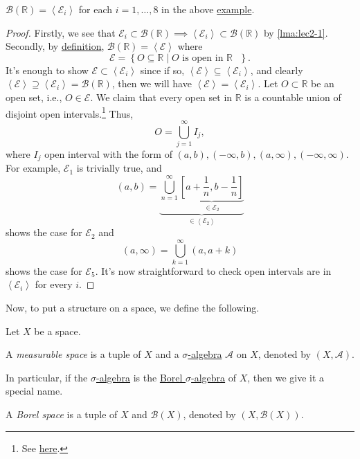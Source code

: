 \begin{proposition}
	\(\mathcal{B} (\mathbb{R} ) = \left<\mathcal{E}_{i}\right> \) for each \(i = 1, \dots, 8\) in the above \hyperref[eg:lec2]{example}.
\end{proposition}
\begin{proof}
	Firstly, we see that \(\mathcal{E} _{i}\subset \mathcal{B} (\mathbb{R} ) \implies \left<\mathcal{E} _{i}\right>\subset \mathcal{B} (\mathbb{R} )\) by \autoref{lma:lec2-1}. Secondly, by \hyperref[def:Borel-sigma-algebra]{definition}, \(\mathcal{B} (\mathbb{R} ) = \left<\mathcal{E} \right>\) where
	\[
		\mathcal{E} = \left\{O\subseteq \mathbb{R}\mid O \text{ is open in \(\mathbb{R}\) } \right\}.
	\]
	It's enough to show \(\mathcal{E} \subset \left<\mathcal{E} _{i}\right>\) since if so, \(\left<\mathcal{E} \right>\subseteq \left<\mathcal{E} _{i}\right>\), and clearly \(\left< \mathcal{E}  \right> \supseteq \left< \mathcal{E}_{i} \right> = \mathcal{B} (\mathbb{R}) \), then we will have \(\left< \mathcal{E}\right> = \left< \mathcal{E} _{i} \right> \). Let \(O\subset \mathbb{R} \) be an open set, i.e., \(O\in\mathcal{E}\). We claim that every open set in \(\mathbb{R} \) is a countable union of disjoint open intervals.\footnote{See \href{https://math.stackexchange.com/questions/318299/any-open-subset-of-bbb-r-is-a-countable-union-of-disjoint-open-intervals}{here}.} Thus,
	\[
		O = \bigcup_{j=1}^{\infty} I_{j},
	\]
	where \(I_{j}\) open interval with the form of \((a, b), (-\infty, b), (a, \infty), (-\infty, \infty)\). For example, \(\mathcal{E} _1\) is trivially true, and
	\[
		(a, b) = \underbrace{\bigcup_{n=1}^{\infty} \underbrace{\left[a+\frac{1}{n}, b-\frac{1}{n}\right]}_{\in \mathcal{E}_2}}_{\in\left<\mathcal{E} _2\right>}
	\]
	shows the case for \(\mathcal{E} _2\) and
	\[
		(a, \infty) = \bigcup_{k=1}^{\infty} (a, a+k)
	\]
	shows the case for \(\mathcal{E} _5\). It's now straightforward to check open intervals are in \(\left<\mathcal{E} _{i}\right>\) for every \(i\).
\end{proof}

Now, to put a structure on a space, we define the following.
\begin{definition*}
	Let \(X\) be a space.
	\begin{definition}\label{def:measurable-space}
		A \emph{measurable space} is a tuple of \(X\) and a \hyperref[def:sigma-algebra]{\(\sigma\)-algebra} \(\mathcal{A} \) on \(X\), denoted by \((X, \mathcal{A} )\).
	\end{definition}

	In particular, if the \hyperref[def:sigma-algebra]{\(\sigma\)-algebra} is the \hyperref[def:Borel-sigma-algebra]{Borel \(\sigma \)-algebra} of \(X\), then we give it a special name.
	\begin{definition}\label{def:Borel-space}
		A \emph{Borel space} is a tuple of \(X\) and \(\mathcal{B} (X)\), denoted by \((X, \mathcal{B} (X))\).
	\end{definition}
\end{definition*}

